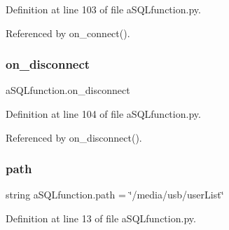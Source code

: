 Definition at line 103 of file a\+S\+Q\+Lfunction.\+py.



Referenced by on\+\_\+connect().

\mbox{\label{namespacea_s_q_lfunction_a4d3034297222fd94d22e5c715f237184}} 
\subsubsection{on\+\_\+disconnect}
{\footnotesize\ttfamily a\+S\+Q\+Lfunction.\+on\+\_\+disconnect}



Definition at line 104 of file a\+S\+Q\+Lfunction.\+py.



Referenced by on\+\_\+disconnect().

\mbox{\label{namespacea_s_q_lfunction_a9a0e66c8f783467abaedfd92599bbce7}} 
\subsubsection{path}
{\footnotesize\ttfamily string a\+S\+Q\+Lfunction.\+path = \char`\"{}/media/usb/user\+List\char`\"{}}



Definition at line 13 of file a\+S\+Q\+Lfunction.\+py.


